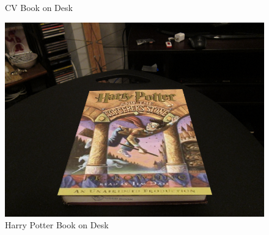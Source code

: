 \begin{problem}[9]
\begin{figure}[H]
\begin{minipage}{0.49\textwidth}
    \caption{CV Book on Desk}
    \label{fig:cv-desk}
  \end{minipage}
  \begin{minipage}{0.49\textwidth}
    \includegraphics[width=\textwidth]{images/hp_desk.png}
    \caption{Harry Potter Book on Desk}
    \label{fig:hp-desk}
  \end{minipage}
\end{figure}


\end{problem}
